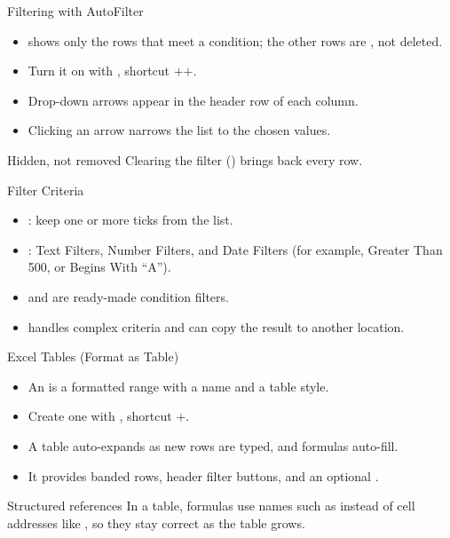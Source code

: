 \documentclass[aspectratio=169]{beamer}
\begin{document}
\begin{frame}{Filtering with AutoFilter}
  \begin{itemize}
    \item {} shows only the rows that meet a condition; the other rows
      are , not deleted.
    \item Turn it on with , shortcut
      $+$$+$.
    \item Drop-down arrows appear in the header row of each column.
    \item Clicking an arrow narrows the list to the chosen values.
  \end{itemize}
  \begin{block}{Hidden, not removed}
    Clearing the filter () brings back every row.
  \end{block}
\end{frame}

\begin{frame}{Filter Criteria}
  \begin{itemize}
    \item {}: keep one or more ticks from the list.
    \item {}: Text Filters, Number Filters, and Date Filters
      (for example, Greater Than 500, or Begins With ``A'').
    \item {} and  are ready-made condition filters.
    \item {} handles complex criteria and can copy the result
      to another location.
  \end{itemize}
\end{frame}

\begin{frame}{Excel Tables (Format as Table)}
  \begin{itemize}
    \item An  is a formatted range with a name and a table
      style.
    \item Create one with , shortcut $+$.
    \item A table auto-expands as new rows are typed, and formulas auto-fill.
    \item It provides banded rows, header filter buttons, and an optional
      .
  \end{itemize}
  \begin{block}{Structured references}
    In a table, formulas use names such as  instead of cell
    addresses like , so they stay correct as the table grows.
  \end{block}
\end{frame}
\end{document}
